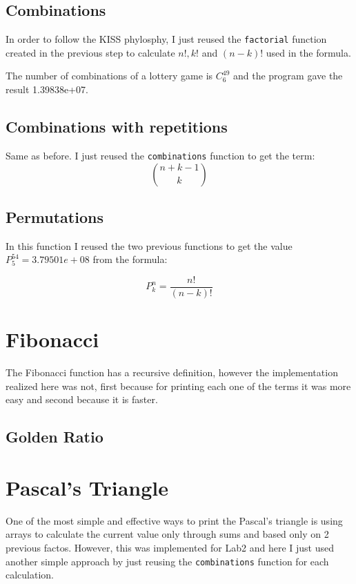 \documentclass{article}
\begin{document}
\subsection{Combinations}
In order to follow the KISS phylosphy, I just reused the 
\verb+factorial+ function created in the previous step to calculate $n!, k!$
and $(n-k)!$ used in the formula.

The number of combinations of a lottery game is $C^{49}_{6}$ and 
the program gave the result 1.39838e+07.

\subsection{Combinations with repetitions}
Same as before. I just reused the \verb+combinations+ function to get
the term:
\begin{equation*}
\binom{n+k-1}{k}
\end{equation*} 

\subsection{Permutations}
In this function I reused the two previous functions to 
get the value $P_5^{54} = 3.79501e+08$ from
the formula:

\begin{equation*}
P_k^n = \frac{n!}{(n-k)!} 
\end{equation*} 


\section{Fibonacci}
\label{sec:fibo}
The Fibonacci function has a recursive definition, however the implementation
realized here was not, first because for printing each one of the terms it was 
more easy and second because it is faster.

\subsection{Golden Ratio}

\section{Pascal's Triangle}
One of the most simple and effective ways to print the Pascal's triangle
is using arrays to calculate the current value only through sums and
based only on 2 previous factos. 
However, this was implemented for Lab2 and here I just used
another simple approach by just reusing the \verb+combinations+ function
for each calculation.
\end{document}
